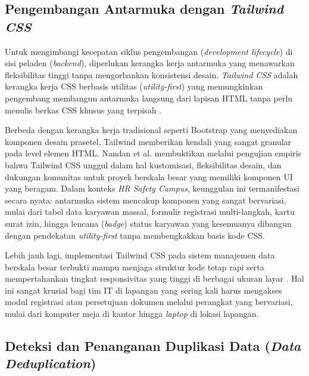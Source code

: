 \subsection{Pengembangan Antarmuka dengan \textit{Tailwind CSS}}

Untuk mengimbangi kecepatan siklus pengembangan (\textit{development lifecycle})
di sisi peladen (\textit{backend}), diperlukan kerangka kerja antarmuka yang
menawarkan fleksibilitas tinggi tanpa mengorbankan konsistensi desain.
\textit{Tailwind CSS} adalah kerangka kerja CSS berbasis utilitas
(\textit{utility-first}) yang memungkinkan pengembang membangun antarmuka
langsung dari lapisan HTML tanpa perlu menulis berkas CSS khusus yang terpisah
\cite{nandan2024tailwind}.

Berbeda dengan kerangka kerja tradisional seperti Bootstrap yang menyediakan
komponen desain prasetel, Tailwind memberikan kendali yang sangat granular pada
level elemen HTML. Nandan et al. \cite{nandan2024tailwind} membuktikan melalui
pengujian empiris bahwa Tailwind CSS unggul dalam hal kustomisasi, fleksibilitas
desain, dan dukungan komunitas untuk proyek berskala besar yang memiliki komponen
UI yang beragam. Dalam konteks \textit{HR Safety Campus}, keunggulan ini
termanifestasi secara nyata: antarmuka sistem mencakup komponen yang sangat
bervariasi, mulai dari tabel data karyawan massal, formulir registrasi
multi-langkah, kartu surat izin, hingga lencana (\textit{badge}) status karyawan
yang kesemuanya dibangun dengan pendekatan \textit{utility-first} tanpa
membengkakkan basis kode CSS.

Lebih jauh lagi, implementasi Tailwind CSS pada sistem manajemen data berskala
besar terbukti mampu menjaga struktur kode tetap rapi serta mempertahankan
tingkat responsivitas yang tinggi di berbagai ukuran layar \cite{ardiyanto2023waterfall}.
Hal ini sangat krusial bagi tim IT di lapangan yang sering kali harus mengakses
modul registrasi atau persetujuan dokumen melalui perangkat yang bervariasi,
mulai dari komputer meja di kantor hingga \textit{laptop} di lokasi lapangan.

\subsection{Deteksi dan Penanganan Duplikasi Data (\textit{Data Deduplication})}

